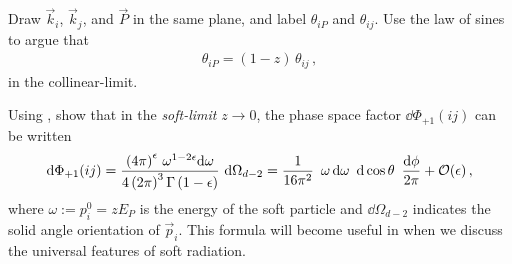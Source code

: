 \begin{exercise}
    \label{ex:collinear-limit-angle}
    Draw \(\Vec{k}_i\), \(\Vec{k}_{j}\), and \(\Vec{P}\) in the same plane, and label \(\theta_{iP}\) and \(\theta_{ij}\).
    Use the law of sines to argue that
    \begin{align}
        \theta_{iP} = (1-z)\,\theta_{ij}
        \,,
    \end{align}
    in the \gls{collinear-limit}.
\end{exercise}



\begin{exercise}
    \label{ex:collinear-phase-space-energy}
    Using , show that in the \textit{\gls{soft-limit}} \(z \to 0\), the phase space factor \(\dd \Phi_{+1}(ij)\) can be written
    \begin{align}
        \dd \Phi_{+1}(ij)
        =
        \frac{
            \left(4 \pi\right)^\epsilon
            \,
            \omega^{1-2\epsilon} \dd \omega
            }{4 \left(2\pi\right)^3 \Gamma\left(1-\epsilon\right)}
        \,\,
        \dd \Omega_{d-2}
        =
        \frac{1}{16\pi^2}
        \,\,\,
        \omega\,\dd \omega
        \,\,\,
        \dd\cos\theta
        \,\,\,
        \frac{\dd\phi}{2\pi}
        +
        \mathcal{O}(\epsilon)
        \,,
    \end{align}
    where \(\omega := p_i^0 = z E_P\) is the energy of the soft particle and \(\dd\Omega_{d-2}\) indicates the solid angle orientation of \(\vec{p}_i\).
    This formula will become useful in  when we discuss the universal features of soft radiation.
\end{exercise}



